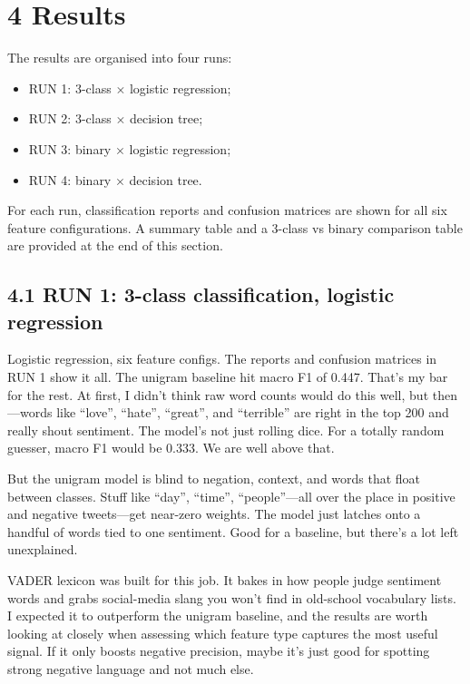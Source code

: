 \documentclass[12pt]{article}
\begin{document}
\section*{4 Results}



The results are organised into four runs:

\begin{itemize}

  \item RUN 1: 3-class $\times$ logistic regression;

  \item RUN 2: 3-class $\times$ decision tree;

  \item RUN 3: binary $\times$ logistic regression;

  \item RUN 4: binary $\times$ decision tree.

\end{itemize} For each run, classification reports and confusion matrices are shown for all six feature configurations. A summary table and a 3-class vs binary comparison table are provided at the end of this section.



\subsection*{4.1 RUN 1: 3-class classification, logistic regression}



Logistic regression, six feature configs. The reports and confusion matrices in RUN 1 show it all. The unigram baseline hit macro F1 of 0.447. That's my bar for the rest. At first, I didn't think raw word counts would do this well, but then---words like ``love'', ``hate'', ``great'', and ``terrible'' are right in the top 200 and really shout sentiment. The model's not just rolling dice. For a totally random guesser, macro F1 would be 0.333. We are well above that.

But the unigram model is blind to negation, context, and words that float between classes. Stuff like ``day'', ``time'', ``people''---all over the place in positive and negative tweets---get near-zero weights. The model just latches onto a handful of words tied to one sentiment. Good for a baseline, but there's a lot left unexplained.

VADER lexicon was built for this job. It bakes in how people judge sentiment words and grabs social-media slang you won't find in old-school vocabulary lists. I expected it to outperform the unigram baseline, and the results are worth looking at closely when assessing which feature type captures the most useful signal. If it only boosts negative precision, maybe it's just good for spotting strong negative language and not much else.
\end{document}
